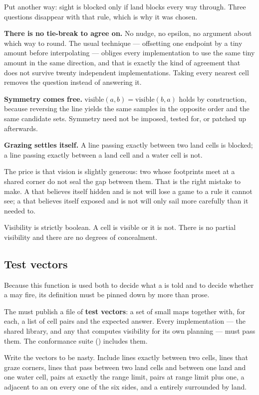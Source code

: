 \documentclass{article}
\begin{document}
Put another way: sight is blocked only if land blocks every way through. Three questions disappear
with that rule, which is why it was chosen.

\textbf{There is no tie-break to agree on.} No nudge, no epsilon, no argument about which way to
round. The usual technique --- offsetting one endpoint by a tiny amount before interpolating ---
obliges every implementation to use the same tiny amount in the same direction, and that is exactly
the kind of agreement that does not survive twenty independent implementations. Taking every
nearest cell removes the question instead of answering it.

\textbf{Symmetry comes free.} $\mathrm{visible}(a,b) = \mathrm{visible}(b,a)$ holds by
construction, because reversing the line yields the same samples in the opposite order and the same
candidate sets. Symmetry need not be imposed, tested for, or patched up afterwards.

\textbf{Grazing settles itself.} A line passing exactly between two land cells is blocked; a line
passing exactly between a land cell and a water cell is not.

The price is that vision is slightly generous: two \islands{} whose footprints meet at a shared
corner do not seal the
gap between them. That is the right mistake to make. A \ship{} that believes itself hidden and is
not will lose a game to a rule it cannot see; a \ship{} that believes itself exposed and is not
will only sail more carefully than it needed to.

Visibility is strictly boolean. A cell is visible or it is not. There is no partial visibility and
there are no degrees of concealment.

\subsection{Test vectors}
\label{proto:vectors}

Because this function is used both to decide what a \ship{} is told and to decide whether a \ship{}
may fire, its definition must be pinned down by more than prose.

The \WG{} must publish a file of \textbf{test vectors}: a set of small maps together with, for
each, a list of cell pairs and the expected answer. Every implementation --- the shared library,
and any \ship{} that computes visibility for its own planning --- must pass them. The conformance
suite (\OD) includes them.

Write the vectors to be nasty. Include lines exactly between two cells, lines that graze corners,
lines that pass between two land cells and between one land and one water cell, pairs at exactly
the range limit, pairs at range limit plus one, a \ship{} adjacent to an \island{} on every one of
the six sides, and a \ship{} entirely surrounded by land.
\end{document}
